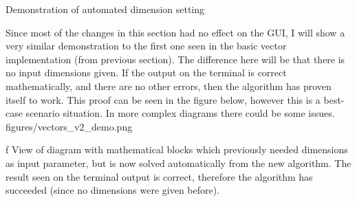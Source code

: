 \secc Demonstration of automated dimension setting

\qquad Since most of the changes in this section had no effect on the GUI, I will show a very similar
demonstration to the first one seen in the basic vector implementation (from previous section). The difference
here will be that there is no input dimensions given. If the output on the terminal is correct mathematically,
and there are no other errors, then the algorithm has proven itself to work. This proof can be seen in the
figure below, however this is a best-case scenario situation. In more complex diagrams there could be some
issues.
\medskip {}
\picw=14cm \cinspic figures/vectors_v2_demo.png
\caption/f View of diagram with mathematical blocks which previously needed dimensions as input parameter,
but is now solved automatically from the new algorithm. The result seen on the terminal output is correct,
therefore the algorithm has succeeded (since no dimensions were given before).
\medskip